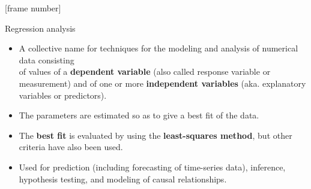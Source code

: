 \documentclass[aspectratio=169,t]{beamer}
\begin{document}
  {
    [frame number]
    \begin{frame}{Regression analysis}
    \begin{itemize}
      \item A collective name for techniques for the modeling and analysis of numerical data consisting \\ of values of a \textbf{{\color{airforceblue}dependent variable}} (also called response variable or measurement) and of one or more \textbf{{\color{airforceblue}independent variables}} (aka. explanatory variables or predictors).
      \item The parameters are estimated so as to give a best fit of the data.
      \item The \textbf{{\color{airforceblue}best fit}} is evaluated by using the \textbf{{\color{airforceblue}least-squares method}}, but other criteria have also been used.
      \item Used for prediction (including forecasting of time-series data), inference, hypothesis testing, and modeling of causal relationships.
    \end{itemize}
    \loadedtable
    \centering
    \end{frame}
  }
\end{document}
